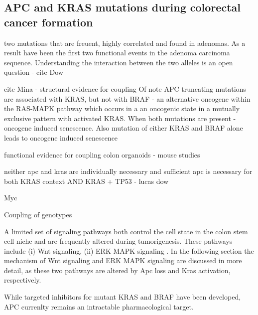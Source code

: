 \begin{flushleft}
\subsection{APC and KRAS mutations during colorectal cancer formation}
two mutations that are freuent, highly correlated and found in adenomas. As a result have been  the first two functional events in the adenoma carcinoma sequence. 
Understanding the interaction between the two alleles is an open question - cite Dow

cite Mina - structural evidence for coupling
Of note APC truncating mutations are associated with KRAS, but not with BRAF - an alternative oncogene within the RAS-MAPK pathway which occurs in a an oncogenic state in a mutually exclusive pattern with activated KRAS. When both mutations are present - oncogene induced senescence. 
Also mutation of either KRAS and BRAF alone leads to oncogene induced senescence

functional evidence for coupling
colon organoids - 
mouse studies 

neither apc and kras are individually necessary and sufficient 
apc is necessary for both KRAS context AND KRAS + TP53 - lucas dow

Myc






Coupling of genotypes

A limited set of signaling pathways both control the cell state in the colon stem cell niche and are frequently altered during tumorigenesis. These pathways include (i) Wnt signaling, (ii) ERK MAPK signaling \cite{gehartTalesCryptNew2019a}. In the following section the mechanism of Wnt signaling and ERK MAPK signaling are discussed in more detail, as these two pathways are altered by Apc loss and Kras activation, respectively.


While targeted inhibitors for mutant KRAS and BRAF have been developed, APC currenlty remains an intractable pharmacological target. 


\end{flushleft}
